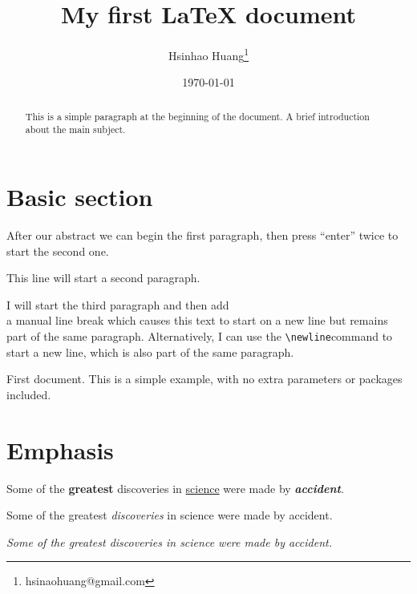 \documentclass[12pt, a4paper]{article} %
\title{My first LaTeX document}                            %
\author{Hsinhao Huang\thanks{hsinaohuang@gmail.com}}       %
\date{\today}                                              %
\begin{document}

    \maketitle

    \tableofcontents

    \begin{abstract}
        This is a simple paragraph at the beginning of the
        document. A brief introduction about the main subject.
    \end{abstract}


    \section{Basic section}
        After our abstract we can begin the first paragraph, then press ``enter'' twice to start the second one.

        This line will start a second paragraph.

        I will start the third paragraph and then add \\ a manual line break which causes
        this text to start on a new line but remains part of the same paragraph.
        Alternatively, I can use the \verb|\newline|\newline command to start a new line,
        which is also part of the same paragraph.

        First document. This is a simple example, with no
        extra parameters or packages included.

    \section{Emphasis}
        Some of the \textbf{greatest}                          %
        discoveries in \underline{science}                     %
        were made by \textbf{\textit{accident}}.               %

        Some of the greatest \emph{discoveries} in science
        were made by accident.

        \textit{Some of the greatest \emph{discoveries}        %
        in science were made by accident.}
\end{document}
